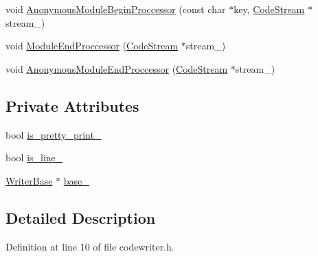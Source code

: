 \begin{DoxyCompactItemize}
\item 
void \hyperlink{classmocha_1_1_code_writer_a5a7c49a9001a89aaaab643fdc758fe6c}{AnonymousModuleBeginProccessor} (const char $\ast$key, \hyperlink{classmocha_1_1_code_stream}{CodeStream} $\ast$stream\_\-)
\item 
void \hyperlink{classmocha_1_1_code_writer_a198b911543f034cd59a77c0ddb9667c8}{ModuleEndProccessor} (\hyperlink{classmocha_1_1_code_stream}{CodeStream} $\ast$stream\_\-)
\item 
void \hyperlink{classmocha_1_1_code_writer_a8a8890b83765cea7c40b2e8ac67192a2}{AnonymousModuleEndProccessor} (\hyperlink{classmocha_1_1_code_stream}{CodeStream} $\ast$stream\_\-)
\end{DoxyCompactItemize}
\subsection*{Private Attributes}
\begin{DoxyCompactItemize}
\item 
bool \hyperlink{classmocha_1_1_code_writer_a500de5cadf77c987ccd3b2d51c9d4487}{is\_\-pretty\_\-print\_\-}
\item 
bool \hyperlink{classmocha_1_1_code_writer_ae3fba73309d6010b17ce1b6ec6a52e4d}{is\_\-line\_\-}
\item 
\hyperlink{classmocha_1_1_code_writer_1_1_writer_base}{WriterBase} $\ast$ \hyperlink{classmocha_1_1_code_writer_a9591201ce4008cddd9873ecc9ecda25d}{base\_\-}
\end{DoxyCompactItemize}


\subsection{Detailed Description}


Definition at line 10 of file codewriter.h.



